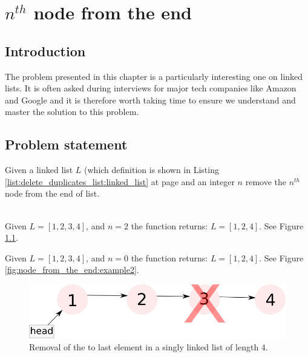 %

\chapter{$n^{th}$ node from the end}
\label{ch:node_from_the_end}
\section*{Introduction}
The problem presented in this chapter is a particularly interesting one on linked lists.
It is often asked during interviews for major tech companies like  Amazon and Google and it is therefore worth taking time to ensure we understand and master the solution to this problem.

\section{Problem statement}
\begin{exercise}
Given a linked list $L$ (which definition is shown in Listing \ref{list:delete_duplicates_list:linked_list} at page \pageref{list:delete_duplicates_list:linked_list}  and an integer $n$ remove the $n^{th}$ node from the end of list.

\begin{example}
	\hfill \\
	Given $L=[1,2,3,4]$, and $n=2$ the function returns: $L=[1,2,4]$. See Figure \ref{fig:node_from_the_end:example1}.
\end{example}

\begin{example}
	Given $L=[1,2,3,4]$, and $n=0$ the function returns: $L=[1,2,4]$.
	See Figure \ref{fig:node_from_the_end:example2}.
\end{example}
\end{exercise}


\begin{figure}
	\label{fig:node_from_the_end:example1}
	\centering
	\includegraphics[scale=1.0]{sources/node_from_the_end/images/example1}
	\caption{Removal of the  to last element in a singly linked list of length $4$.}
\end{figure}

